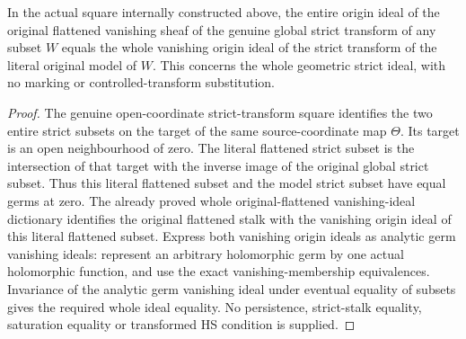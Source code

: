 \begin{lemma}
\label{hir:actual-strict-contact-whole-stalk-dictionary}
\leanok
In the actual square internally constructed above, the entire origin ideal of the original flattened vanishing sheaf of the genuine global strict transform of any subset $W$ equals the whole vanishing origin ideal of the strict transform of the literal original model of $W$. This concerns the whole geometric strict ideal, with no marking or controlled-transform substitution.
\end{lemma}
\begin{proof}
The genuine open-coordinate strict-transform square identifies the two entire strict subsets on the target of the same source-coordinate map $\Theta$. Its target is an open neighbourhood of zero. The literal flattened strict subset is the intersection of that target with the inverse image of the original global strict subset. Thus this literal flattened subset and the model strict subset have equal germs at zero. The already proved whole original-flattened vanishing-ideal dictionary identifies the original flattened stalk with the vanishing origin ideal of this literal flattened subset. Express both vanishing origin ideals as analytic germ vanishing ideals: represent an arbitrary holomorphic germ by one actual holomorphic function, and use the exact vanishing-membership equivalences. Invariance of the analytic germ vanishing ideal under eventual equality of subsets gives the required whole ideal equality. No persistence, strict-stalk equality, saturation equality or transformed HS condition is supplied.
\end{proof}


